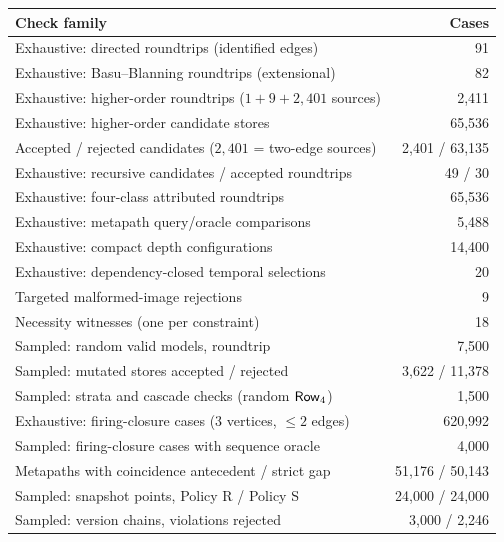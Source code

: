 \begin{tabular}{L{10.2cm}r}
\toprule
Check family & Cases \\
\midrule
Exhaustive: directed roundtrips (identified edges) & 91 \\
Exhaustive: Basu--Blanning roundtrips (extensional) & 82 \\
Exhaustive: higher-order roundtrips ($1+9+2{,}401$ sources) & 2,411 \\
Exhaustive: higher-order candidate stores & 65,536 \\
Accepted / rejected candidates ($2{,}401$ = two-edge sources) & 2,401 / 63,135 \\
Exhaustive: recursive candidates / accepted roundtrips & 49 / 30 \\
Exhaustive: four-class attributed roundtrips & 65,536 \\
Exhaustive: metapath query/oracle comparisons & 5,488 \\
Exhaustive: compact depth configurations & 14,400 \\
Exhaustive: dependency-closed temporal selections & 20 \\
Targeted malformed-image rejections & 9 \\
Necessity witnesses (one per constraint) & 18 \\
Sampled: random valid models, roundtrip & 7,500 \\
Sampled: mutated stores accepted / rejected & 3,622 / 11,378 \\
Sampled: strata and cascade checks (random $\mathsf{Row}_{4}$) & 1,500 \\
Exhaustive: firing-closure cases (3 vertices, $\le2$ edges) & 620,992 \\
Sampled: firing-closure cases with sequence oracle & 4,000 \\
Metapaths with coincidence antecedent / strict gap & 51,176 / 50,143 \\
Sampled: snapshot points, Policy R / Policy S & 24,000 / 24,000 \\
Sampled: version chains, violations rejected & 3,000 / 2,246 \\
\bottomrule
\end{tabular}
